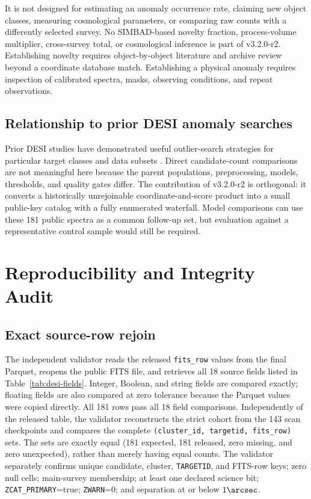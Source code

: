 \documentclass[twocolumn]{aastex701}
\newcommand{\releaseVersion}{v3.2.0-r2}
\begin{document}
It is not designed for estimating an anomaly occurrence rate, claiming new object classes,
measuring cosmological parameters, or comparing raw counts with a differently selected survey.
No SIMBAD-based novelty fraction, process-volume multiplier, cross-survey total, or cosmological
inference is part of \releaseVersion{}.  Establishing novelty requires object-by-object literature and archive
review beyond a coordinate database match.  Establishing a physical anomaly requires inspection
of calibrated spectra, masks, observing conditions, and repeat observations.

\subsection{Relationship to prior DESI anomaly searches}\label{sec:prior}

Prior DESI studies have demonstrated useful outlier-search strategies for particular target
classes and data subsets \citep{Liang2023,Nicolaou2026}.  Direct candidate-count comparisons are
not meaningful here because the parent populations, preprocessing, models, thresholds, and
quality gates differ.  The contribution of \releaseVersion{} is orthogonal: it converts a historically
unrejoinable coordinate-and-score product into a small public-key catalog with a fully enumerated
waterfall.  Model comparisons can use these 181 public spectra as a common follow-up set,
but evaluation against a representative control sample would still be required.

\section{Reproducibility and Integrity Audit}\label{sec:reproducibility}

\subsection{Exact source-row rejoin}\label{sec:exact-rejoin}

The independent validator reads the released \texttt{fits\_row} values from the final Parquet,
reopens the public FITS file, and retrieves all 18 source fields listed in
Table~\ref{tab:desi-fields}.  Integer, Boolean, and string fields are compared exactly; floating
fields are also compared at zero tolerance because the Parquet values were copied directly.
All 181 rows pass all 18 field comparisons.  Independently of the released table, the validator
reconstructs the strict cohort from the 143 scan checkpoints and compares the complete
\texttt{(cluster\_id, targetid, fits\_row)} sets.  The sets are exactly equal (181 expected,
181 released, zero missing, and zero unexpected), rather than merely having equal counts.
The validator separately confirms unique candidate,
cluster, \texttt{TARGETID}, and FITS-row keys; zero null cells; main-survey membership; at least one
declared science bit; \texttt{ZCAT\_PRIMARY}=true; \texttt{ZWARN}=0; and separation at or below
$1\arcsec$.
\end{document}
